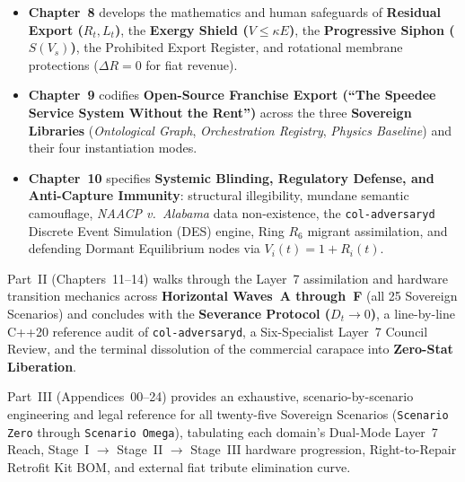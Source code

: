 \begin{itemize}
    \item \textbf{Chapter~8} develops the mathematics and human safeguards of \textbf{Residual Export ($R_t, L_t$)}, the \textbf{Exergy Shield ($V \le \kappa E$)}, the \textbf{Progressive Siphon ($S(V_s)$)}, the Prohibited Export Register, and rotational membrane protections ($\Delta R = 0$ for fiat revenue).
    \item \textbf{Chapter~9} codifies \textbf{Open-Source Franchise Export (``The Speedee Service System Without the Rent'')} across the three \textbf{Sovereign Libraries} (\textit{Ontological Graph}, \textit{Orchestration Registry}, \textit{Physics Baseline}) and their four instantiation modes.
    \item \textbf{Chapter~10} specifies \textbf{Systemic Blinding, Regulatory Defense, and Anti-Capture Immunity}: structural illegibility, mundane semantic camouflage, \textit{NAACP v.~Alabama} data non-existence, the \texttt{col-adversaryd} Discrete Event Simulation (DES) engine, Ring $R_6$ migrant assimilation, and defending Dormant Equilibrium nodes via $V_i(t) = 1 + R_i(t)$.
\end{itemize}

Part~II (Chapters~11--14) walks through the Layer~7 assimilation and hardware transition mechanics across \textbf{Horizontal Waves~A through~F} (all 25 Sovereign Scenarios) and concludes with the \textbf{Severance Protocol ($D_t \to 0$)}, a line-by-line C++20 reference audit of \texttt{col-adversaryd}, a Six-Specialist Layer~7 Council Review, and the terminal dissolution of the commercial carapace into \textbf{Zero-Stat Liberation}.

Part~III (Appendices~00--24) provides an exhaustive, scenario-by-scenario engineering and legal reference for all twenty-five Sovereign Scenarios (\texttt{Scenario Zero} through \texttt{Scenario Omega}), tabulating each domain's Dual-Mode Layer~7 Reach, Stage~I $\to$ Stage~II $\to$ Stage~III hardware progression, Right-to-Repair Retrofit Kit BOM, and external fiat tribute elimination curve.
